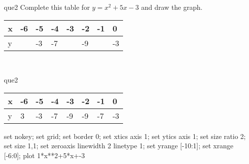 \documentclass[13.5pt, varwidth=true]{beamer}
\begin{document}
\begin{frame}[shrink=19,fragile]
	\begin{beamercolorbox}[rounded=true, left, shadow=true,wd=14.8cm]{que2}
		 Complete this table for $y = x^{2} + 5x - 3$ and draw the graph. \\[0.3cm] \renewcommand{\arraystretch}{1.2}\begin{tabular}{|C|C|C|C|C|C|C|C|} \hline x & -6 & -5 & -4 & -3 & -2 & -1 & 0 \\ \hline y &  & -3 & -7 &  & -9 &  & -3\\ \hline \end{tabular}\\[0.3cm]
	\end{beamercolorbox}
\end{frame}
\begin{frame}[shrink=19,fragile]
	\begin{beamercolorbox}[rounded=true, left, shadow=true,wd=14.8cm]{que2}
		\renewcommand{\arraystretch}{1.2}\begin{tabular}{|C|C|C|C|C|C|C|C|} \hline x & -6 & -5 & -4 & -3 & -2 & -1 & 0 \\ \hline y & 3 & -3 & -7 & -9 & -9 & -7 & -3\\ \hline \end{tabular}\begin{gnuplot}[terminal=pdf] set nokey; set grid; set border 0; set xtics axis 1; set ytics axis 1; set size ratio 2; set size 1,1; set zeroaxis linewidth 2 linetype 1; set yrange [-10:1]; set xrange [-6:0]; plot 1*x**2+5*x+-3 \end{gnuplot}
	\end{beamercolorbox}
\end{frame}
\end{document}
